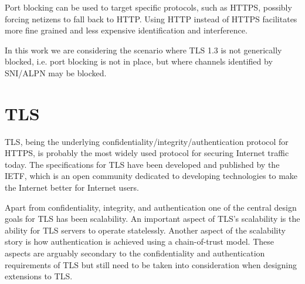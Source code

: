 Port blocking can be used to target specific protocols, such as \ac{HTTPS}, possibly forcing netizens to fall back to \ac{HTTP}.
Using \ac{HTTP} instead of \ac{HTTPS} facilitates more fine grained and less expensive identification and interference.

In this work we are considering the scenario where \ac{TLS} 1.3 is not generically blocked, i.e. port blocking is not in place,
but where channels identified by \ac{SNI}/\ac{ALPN} may be blocked.






\section{TLS}

\ac{TLS}, being the underlying confidentiality/integrity/authentication protocol for \ac{HTTPS},
is probably the most widely used protocol for securing Internet traffic today.
The specifications for \ac{TLS} have been developed and published by the \ac{IETF},
which is an open community dedicated to developing technologies to make the Internet better
for Internet users.


Apart from confidentiality, integrity, and authentication one of the central
design goals for \ac{TLS} has been scalability.
An important aspect of \ac{TLS}'s scalability is the ability
for \ac{TLS} servers to operate statelessly.
Another aspect of the scalability story is how
authentication is achieved using a chain-of-trust model.
These aspects are arguably secondary to the confidentiality and authentication
requirements of \ac{TLS} but still need to be taken into consideration
when designing extensions to \ac{TLS}.

